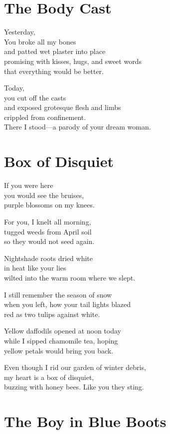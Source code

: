 \documentclass[twoside,10pt]{book}
\begin{document}
\clearpage
\section{The Body Cast}

Yesterday,\\
You broke all my bones\\
and patted wet plaster into place\\
promising with kisses, hugs, and sweet words\\
that everything would be better.

Today,\\
you cut off the casts\\
and exposed grotesque flesh and limbs\\
crippled from confinement.\\
There I stood---a parody of your dream woman.


\clearpage
\section{Box of Disquiet}

If you were here\\
you would see the bruises,\\
purple blossoms on my knees.

For you, I knelt all morning,\\
tugged weeds from April soil\\
so they would not seed again.

Nightshade roots dried white\\
in heat like your lies\\
wilted into the warm room where we slept.

I still remember the season of snow\\
when you left, how your tail lights blazed\\
red as two tulips against white.

Yellow daffodils opened at noon today\\
while I sipped chamomile tea, hoping\\
yellow petals would bring you back.

Even though I rid our garden of winter debris,\\
my heart is a box of disquiet,\\
buzzing with honey bees. Like you they sting.


\clearpage
\section{The Boy in Blue Boots}
\end{document}
